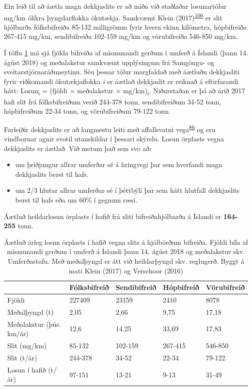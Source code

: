 \documentclass[icelandic,]{book}
\providecommand{\tightlist}{%
  \setlength{\itemsep}{0pt}\setlength{\parskip}{0pt}}
\begin{document}
Ein leið til að áætla magn dekkjaslits er að miða við staðlaðar losunartölur mg/km ólíkra þyngdarflokka ökutækja. Samkvæmt Klein (2017)\textsuperscript{\protect\hyperlink{ref-klein2017methods}{100}} er slit hjólbarða fólksbifreiða 85-132 milligrömm fyrir hvern ekinn kílómetra, hópbifreiða 267-415 mg/km, sendibifreiða 102-159 mg/km og vörubifreiða 546-850 mg/km.

Í töflu \ref{tab:akstur} má sjá fjölda bifreiða af mismunandi gerðum í umferð á Íslandi (þann 14. ágúst 2018) og meðalakstur samkvæmt upplýsingum frá Samgöngu- og sveitarstjórnaráðuneytinu. Séu þessar tölur margfaldað með áætluðu dekkjasliti fyrir viðkomandi ökutækjaflokka \emph{i} er áætlað dekkjaslit er reiknað á eftirfarandi hátt: Losun\textsubscript{i} = (fjöldi × meðalakstur × mg/km)\textsubscript{i}. Niðurstaðan er þá að árið 2017 hafi slit frá fólksbifreiðum verið 244-378 tonn, sendibifreiðum 34-52 tonn, hópbifreiðum 22-34 tonn, og vörubifreiðum 79-122 tonn.

Farleiðir dekkjaslits er að langmestu leiti með affallsvatni vega\textsuperscript{\protect\hyperlink{ref-Verschoor2016}{86}} og eru vindbornar agnir svotil utanskildar í þessari skýrslu. Losun örplasts vegna dekkjaslits er áætlað. Við metum það sem svo að:

\begin{itemize}
\tightlist
\item
  um þriðjungur allrar umferðar sé á hringvegi þar sem hverfandi magn dekkjaslits berst til hafs.
\item
  um 2/3 hlutar allrar umferðar sé í þéttbýli þar sem hátt hlutfall dekkjaslits berst til hafs eða um 60\% í gegnum ræsi.
\end{itemize}

Áætluð heildarlosun örplasts í hafið frá sliti bifreiðahjólbarða á Íslandi er \textbf{164-255} tonn.

\begin{table}[t]

\caption{\label{tab:akstur}Áætluð árleg losun örplasts í hafið vegna slits á hjólbörðum bifreiða. Fjöldi bíla af mismunandi gerðum í umferð á Íslandi þann 14. ágúst 2018 og meðalakstur skv. Umferðastofu. Með meðalþyngd er átt við heildarþyngd skv. reglugerð. Byggt á mati Klein (2017) og Verschoor (2016)}
\centering
\begin{tabular}{lllll}
\toprule
  & Fólksbifreið & Sendibifreið & Hópbifreið & Vörubifreið\\
\midrule
Fjöldi & 227409 & 23159 & 2410 & 8078\\
Meðalþyngd (t) & 2,05 & 2,66 & 9,75 & 17,18\\
Meðalakstur (þús. km/ár) & 12,6 & 14,25 & 33,69 & 17,83\\
Slit (mg/km) & 85-132 & 102-159 & 267-415 & 546-850\\
Slit (t/ár) & 244-378 & 34-52 & 22-34 & 79-122\\
\addlinespace
Losun í hafið (t/ár) & 97-151 & 13-21 & 9-13 & 31-49\\
\bottomrule
\end{tabular}
\end{table}
\end{document}
